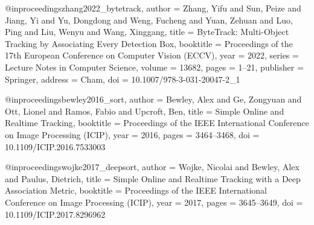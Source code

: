 %
%



@inproceedings{zhang2022_bytetrack,
  author    = {Zhang, Yifu and Sun, Peize and Jiang, Yi and Yu, Dongdong
               and Weng, Fucheng and Yuan, Zehuan and Luo, Ping
               and Liu, Wenyu and Wang, Xinggang},
  title     = {{ByteTrack}: Multi-Object Tracking by Associating Every Detection Box},
  booktitle = {Proceedings of the 17th European Conference on Computer Vision (ECCV)},
  year      = {2022},
  series    = {Lecture Notes in Computer Science},
  volume    = {13682},
  pages     = {1--21},
  publisher = {Springer},
  address   = {Cham},
  doi       = {10.1007/978-3-031-20047-2_1}
}

@inproceedings{bewley2016_sort,
  author    = {Bewley, Alex and Ge, Zongyuan and Ott, Lionel
               and Ramos, Fabio and Upcroft, Ben},
  title     = {Simple Online and Realtime Tracking},
  booktitle = {Proceedings of the IEEE International Conference on
               Image Processing (ICIP)},
  year      = {2016},
  pages     = {3464--3468},
  doi       = {10.1109/ICIP.2016.7533003}
}

@inproceedings{wojke2017_deepsort,
  author    = {Wojke, Nicolai and Bewley, Alex and Paulus, Dietrich},
  title     = {Simple Online and Realtime Tracking with a Deep
               Association Metric},
  booktitle = {Proceedings of the IEEE International Conference on
               Image Processing (ICIP)},
  year      = {2017},
  pages     = {3645--3649},
  doi       = {10.1109/ICIP.2017.8296962}
}

